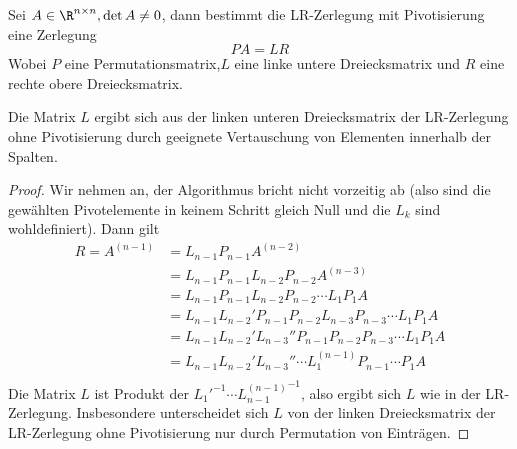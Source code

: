 \documentclass{mycourse}
\begin{document}
\begin{st}
	\label{st:3.8}
	Sei $A\in \R^{n\times n}, \det A\neq 0$, dann bestimmt die LR-Zerlegung mit Pivotisierung eine Zerlegung 
	\[
		PA=LR
	\]
	Wobei $P$ eine Permutationsmatrix,$L$ eine linke untere Dreiecksmatrix und $R$ eine rechte obere Dreiecksmatrix.

	Die Matrix $L$ ergibt sich aus der linken unteren Dreiecksmatrix der LR-Zerlegung ohne Pivotisierung durch geeignete Vertauschung von Elementen innerhalb der Spalten.
	\begin{proof}
		Wir nehmen an, der Algorithmus bricht nicht vorzeitig ab (also sind die gewählten Pivotelemente in keinem Schritt gleich Null und die $L_k$ sind wohldefiniert).
		Dann gilt
		\begin{align*}
			R = A^{(n-1)} &= L_{n-1} P_{n-1}A^{(n-2)} \\
					   &= L_{n-1}P_{n-1}L_{n-2}P_{n-2}A^{(n-3)} \\
					   &= L_{n-1}P_{n-1}L_{n-2}P_{n-2}\dotsb L_1P_1A \\
					   &= L_{n-1}L_{n-2}'P_{n-1}P_{n-2}L_{n-3}P_{n-3} \dotsb L_1P_1A \\
					   &= L_{n-1}L_{n-2}' L_{n-3}'' P_{n-1}P_{n-2}P_{n-3} \dotsb L_1P_1A\\
					   &= L_{n-1}L_{n-2}'L_{n-3}''\dotsb  L_1^{(n-1)} P_{n-1}\dotsb P_1 A\\
		\end{align*}
		Die Matrix $L$ ist Produkt der ${L_1'}^{-1} \dotsb {L_{n-1}^{(n-1)}}^{-1}$,
		also ergibt sich $L$ wie in der LR-Zerlegung.
		Insbesondere unterscheidet sich $L$ von der linken Dreiecksmatrix der LR-Zerlegung ohne Pivotisierung nur durch Permutation von Einträgen.


\end{proof}
\end{st}
\end{document}
